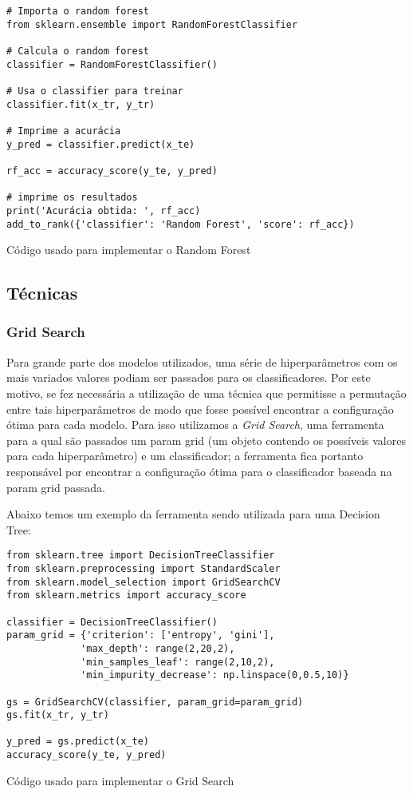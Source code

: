 \documentclass[]{IEEEphot}
\begin{document}
\newpage

\begin{listing}[!ht]
\begin{verbatim}
# Importa o random forest
from sklearn.ensemble import RandomForestClassifier

# Calcula o random forest
classifier = RandomForestClassifier()

# Usa o classifier para treinar
classifier.fit(x_tr, y_tr)

# Imprime a acurácia
y_pred = classifier.predict(x_te)

rf_acc = accuracy_score(y_te, y_pred)

# imprime os resultados
print('Acurácia obtida: ', rf_acc)
add_to_rank({'classifier': 'Random Forest', 'score': rf_acc})
\end{verbatim}

\caption{Código usado para implementar o Random Forest}
\end{listing}

\subsection{Técnicas}

\subsubsection{Grid Search}

Para grande parte dos modelos utilizados, uma série de hiperparâmetros com os mais variados valores podiam ser passados para os classificadores. Por este motivo, se fez necessária a utilização de uma técnica que permitisse a permutação entre tais hiperparâmetros de modo que fosse possível encontrar a configuração ótima para cada modelo. Para isso utilizamos a \textit{Grid Search}, uma ferramenta para a qual são passados um param grid (um objeto contendo os possíveis valores para cada hiperparâmetro) e um classificador; a ferramenta fica portanto responsável por encontrar a configuração ótima para o classificador baseada na param grid passada.

Abaixo temos um exemplo da ferramenta sendo utilizada para uma Decision Tree:

\begin{listing}[!ht]
\begin{verbatim}
from sklearn.tree import DecisionTreeClassifier
from sklearn.preprocessing import StandardScaler
from sklearn.model_selection import GridSearchCV
from sklearn.metrics import accuracy_score

classifier = DecisionTreeClassifier()
param_grid = {'criterion': ['entropy', 'gini'],
             'max_depth': range(2,20,2),
             'min_samples_leaf': range(2,10,2),
             'min_impurity_decrease': np.linspace(0,0.5,10)}

gs = GridSearchCV(classifier, param_grid=param_grid)
gs.fit(x_tr, y_tr)

y_pred = gs.predict(x_te)
accuracy_score(y_te, y_pred)
\end{verbatim}

\caption{Código usado para implementar o Grid Search}
\end{listing}
\end{document}

